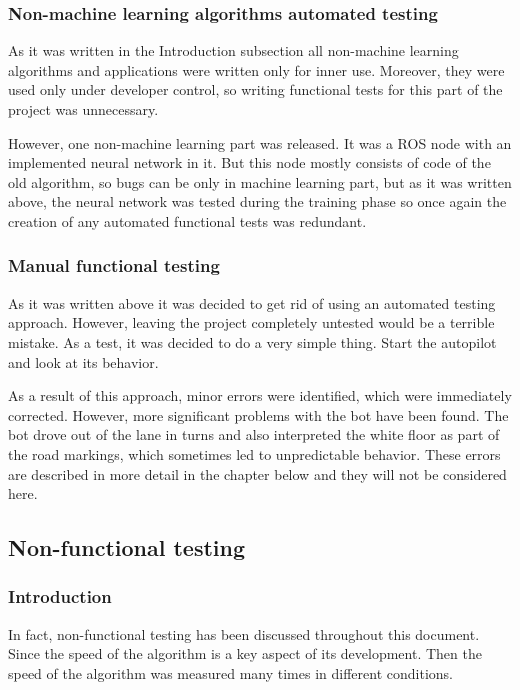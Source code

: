 \subsubsection{Non-machine learning algorithms automated testing}
As it was written in the Introduction subsection all non-machine learning algorithms and applications were written only for inner use. Moreover, they were used
only under developer control, so writing functional tests for this part of the project was unnecessary.

However, one non-machine learning part was released. It was a ROS node with an implemented neural network in it. 
But this node mostly consists of code of the old algorithm, so bugs can be only in machine learning part, but as it was written above, 
the neural network was tested during the training phase so once again the creation
of any automated functional tests was redundant. 

\subsubsection{Manual functional testing}
As it was written above it was decided to get rid of using an automated testing approach. However, leaving the project completely untested would be a terrible mistake.
As a test, it was decided to do a very simple thing. Start the autopilot and look at its behavior. 

As a result of this approach, minor errors were identified, which were immediately corrected. However, more significant problems with the bot have been found.
The bot drove out of the lane in turns and also interpreted the white floor as part of the road markings, which sometimes led to unpredictable behavior.
These errors are described in more detail in the chapter below and they will not be considered here.

\subsection{Non-functional testing}

\subsubsection{Introduction}
In fact, non-functional testing has been discussed throughout this document. Since the speed of the algorithm is a key
aspect of its development. Then the speed of the algorithm was measured many times in different conditions.


